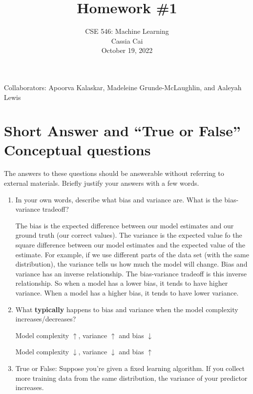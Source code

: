 \documentclass{article}
\begin{document}
\setcounter{aprob}{0}
\title{Homework \#1}
\author{
    \normalsize{CSE 546: Machine Learning}\\
    \normalsize{Cassia Cai}\\
    \normalsize{October 19, 2022}\\
}
\date{{}}
\maketitle

Collaborators: Apoorva Kalaskar, Madeleine Grunde-McLaughlin, and Aaleyah Lewis

\section*{Short Answer and ``True or False'' Conceptual questions}
\begin{aprob}
    The answers to these questions should be answerable without referring to external materials.  Briefly justify your answers with a few words.
    \begin{enumerate}
        \item{} In your own words, describe what bias and variance are. What is the bias-variance tradeoff?
        
        The bias is the expected difference between our model estimates and our ground truth (our correct values). The variance is the expected value fo the square difference between our model estimates and the expected value of the estimate. For example, if we use different parts of the data set (with the same distribution), the variance tells us how much the model will change. Bias and variance has an inverse relationship. The bias-variance tradeoff is this inverse relationship. So when a model has a lower bias, it tends to have higher variance. When a model has a higher bias, it tends to have lower variance.

        \item {} What \textbf{typically} happens to bias and variance when the model complexity increases/decreases?
        
        Model complexity $\uparrow$, variance $\uparrow$ and bias $\downarrow$
        
        Model complexity $\downarrow$, variance $\downarrow$ and bias $\uparrow$
        
        \item {} True or False: Suppose you're given a fixed learning algorithm. If you collect more training data from the same distribution, the variance of your predictor increases.
        

\end{enumerate}
\end{aprob}
\end{document}
